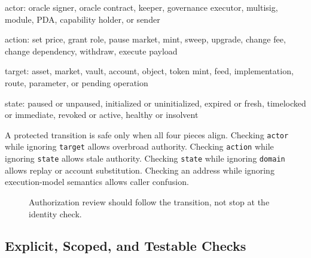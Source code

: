 \begin{codeblock}
actor:
    oracle signer, oracle contract, keeper, governance executor,
    multisig, module, PDA, capability holder, or sender

action:
    set price, grant role, pause market, mint, sweep, upgrade,
    change fee, change dependency, withdraw, execute payload

target:
    asset, market, vault, account, object, token mint, feed,
    implementation, route, parameter, or pending operation

state:
    paused or unpaused, initialized or uninitialized, expired or fresh,
    timelocked or immediate, revoked or active, healthy or insolvent
\end{codeblock}

A protected transition is safe only when all four pieces align. Checking \texttt{actor} while ignoring \texttt{target} allows overbroad authority. Checking \texttt{action} while ignoring \texttt{state} allows stale authority. Checking \texttt{state} while ignoring \texttt{domain} allows replay or account substitution. Checking an address while ignoring execution-model semantics allows caller confusion.

\begin{figure}[htbp]
\centering
{}
\caption{Authorization review should follow the transition, not stop at the identity check.}
\end{figure}

\subsection{Explicit, Scoped, and Testable Checks}

